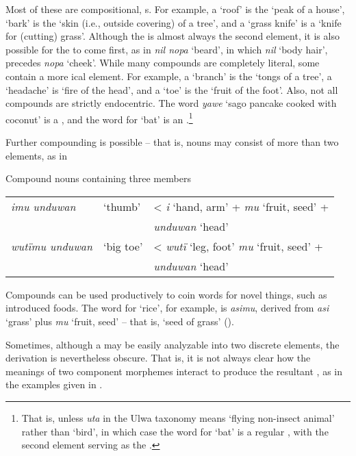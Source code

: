 Most of these are compositional, s. For example, a ‘roof’ is the ‘peak of a house’, ‘bark’ is the ‘skin (i.e., outside covering) of a tree’, and a ‘grass knife’ is a ‘knife for (cutting) grass’. Although the  is almost always the second element, it is also possible for the  to come first, as in \textit{nil nopa} ‘beard’, in which \textit{nil} ‘body hair’, precedes \textit{nopa} ‘cheek’. While many compounds are completely literal, some contain a more ical element. For example, a ‘branch’ is the ‘tongs of a tree’, a ‘headache’ is ‘fire of the head’, and a ‘toe’ is the ‘fruit of the foot’. Also, not all compounds are strictly endocentric. The word \textit{yawe} ‘sago pancake cooked with coconut’ is a , and the word for ‘bat’ is an .\footnote{That is, unless \textit{uta} in the Ulwa taxonomy means ‘flying non-insect animal’ rather than ‘bird’, in which case the word for ‘bat’ is a regular , with the second element serving as the .}

  Further compounding is possible – that is,  nouns may consist of more than two  elements, as in 

\ea%
    \label{ex:nouns:43a}
          Compound nouns containing three members\\
          \begin{tabular}[t]{lll}
    \textit{imu unduwan}   &  ‘thumb’& {< \textit{i} ‘hand, arm’ + \textit{mu} ‘fruit, seed’ +}\\
    &  & {\textit{unduwan} ‘head’}\\

    \textit{wutïmu unduwan}   &   ‘big toe’ & {< \textit{wutï} ‘leg, foot’ \textit{mu} ‘fruit, seed’ +}\\
    & & {\textit{unduwan} ‘head’}\\
\end{tabular}
\z

  Compounds can be used productively to coin words for novel things, such as introduced foods. The word for ‘rice’, for example, is \textit{asimu}, derived from \textit{asi} ‘grass’ plus \textit{mu} ‘fruit, seed’ -- that is, ‘seed of grass’ ().

  Sometimes, although a  may be easily analyzable into two discrete  elements, the  derivation is nevertheless obscure. That is, it is not always clear how the meanings of two component morphemes interact to produce the resultant , as in the examples given in .

